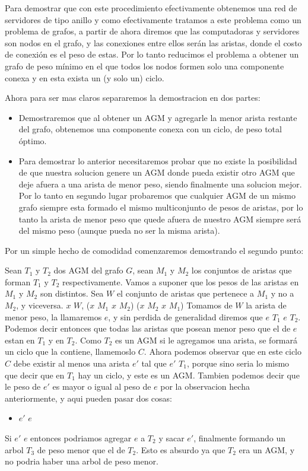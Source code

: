 Para demostrar que con este procedimiento efectivamente obtenemos una red de servidores de tipo anillo y como efectivamente tratamos a este problema como un problema de grafos, a partir de ahora diremos que las computadoras y servidores son nodos en el grafo, y las conexiones entre ellos serán las aristas, donde el costo de conexión es el peso de estas. Por lo tanto reducimos el problema a obtener un grafo de peso mínimo en el que todos los nodos formen solo una componente conexa y en esta exista un (y solo un) ciclo.

Ahora para ser mas claros separaremos la demostracion en dos partes:

\begin{itemize}
\item Demostraremos que al obtener un AGM y agregarle la menor arista restante del grafo, obtenemos una componente conexa con un ciclo, de peso total óptimo.
\item Para demostrar lo anterior necesitaremos probar que no existe la posibilidad de que nuestra solucion genere un AGM donde pueda existir otro AGM que deje afuera a una arista de menor peso, siendo finalmente una solucion mejor. Por lo tanto en segundo lugar probaremos que cualquier AGM de un mismo grafo siempre esta formado el mismo multiconjunto de pesos de aristas, por lo tanto la arista de menor peso que quede afuera de nuestro AGM siempre será del mismo peso (aunque pueda no ser la misma arista).
\end{itemize}

Por un simple hecho de comodidad comenzaremos demostrando el segundo punto:

Sean $T_1$ y $T_2$ dos AGM del grafo $G$, sean $M_1$ y $M_2$ los conjuntos de aristas que forman $T_1$ y $T_2$ respectivamente. Vamos a suponer que los pesos de las aristas en $M_1$ y $M_2$ son distintos. Sea $W$ el conjunto de aristas que pertenece a $M_1$ y no a $M_2$, y viceversa. \forall $x$ \in $W$, ($x$ \in $M_1$ \wedge $x$ \nin $M_2$) \vee ($x$ \in $M_2$ \wedge $x$ \in $M_1$)
Tomamos de $W$ la arista de menor peso, la llamaremos $e$, y sin perdida de generalidad diremos que $e$ \in $T_1$ \wedge $e$ \nin $T_2$. Podemos decir entonces que todas las aristas que posean menor peso que el de $e$ estan en $T_1$ y en $T_2$.
Como $T_2$ es un AGM si le agregamos una arista, se formar\'a un ciclo que la contiene, llamemoslo $C$. Ahora podemos observar que en este ciclo $C$ debe existir al menos una arista $e'$ tal que $e'$ \nin $T_1$, porque sino seria lo mismo que decir que en $T_1$ hay un ciclo, y este es un AGM. Tambien podemos decir que le peso de $e'$ es mayor o igual al peso de $e$ por la observacion hecha anteriormente, y aqui pueden pasar dos cosas:
\begin{itemize}
\item $e'$ \geq $e$
\end{itemize}
Si $e'$ \geq $e$ entonces podriamos agregar $e$ a $T_2$ y sacar $e'$, finalmente formando un arbol $T_3$ de peso menor que el de $T_2$. Esto es absurdo ya que $T_2$ era un AGM, y no podria haber una arbol de peso menor.

